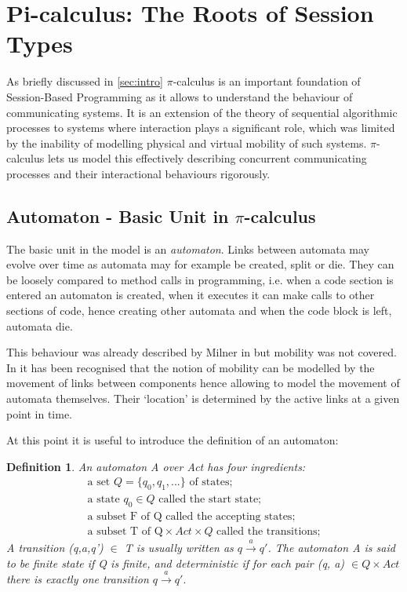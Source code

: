 
\section{Pi-calculus: The Roots of Session Types}
\label{sec:picalculus}
	
As briefly discussed in \autoref{sec:intro} $\pi$-calculus is an important foundation of Session-Based Programming as it allows to understand the behaviour of communicating systems. It is an extension of the theory of sequential algorithmic processes to systems where interaction plays a significant role, which was limited by the inability of modelling physical and virtual mobility of such systems. $\pi$-calculus lets us model this effectively describing concurrent communicating processes and their interactional behaviours rigorously.

\subsection{Automaton - Basic Unit in $\pi$-calculus}
The basic unit in the model is an \textit{automaton}. Links between automata may evolve over time as automata may for example be created, split or die. They can be loosely compared to method calls in programming, i.e. when a code section is entered an automaton is created, when it executes it can make calls to other sections of code, hence creating other automata and when the code block is left, automata die.

This behaviour was already described by Milner in \cite{comm_sys_calc} but mobility was not covered. In \cite{pi-calculus} it has been recognised that the notion of mobility can be modelled by the movement of links between components hence allowing to model the movement of automata themselves. Their `location' is determined by the active links at a given point in time.

At this point it is useful to introduce the definition of an automaton:

\newtheorem{automaton}{Definition}
\begin{automaton}
An automaton A over Act has four ingredients:
\begin{align}
\mbox{a set }Q = \{q_0,q_1,...\}\mbox{ of states;}\nonumber\\
\mbox{a state } q_0 \in Q  \mbox{ called the start state;}\nonumber\\
\mbox{a subset F of Q called the accepting states;}\nonumber\\
\mbox{a subset T of Q} \times Act \times Q\mbox{ called the transitions;}\nonumber
\end{align}
A transition (q,a,q')  $\in$ T is usually written as $q \xrightarrow{a} q'$. The automaton A is said to be finite state if Q is finite, and deterministic if for each pair (q, a) $\in Q \times Act$ there is exactly one transition $q \xrightarrow{a} q'.$\cite{pi-calculus}
\end{automaton}

